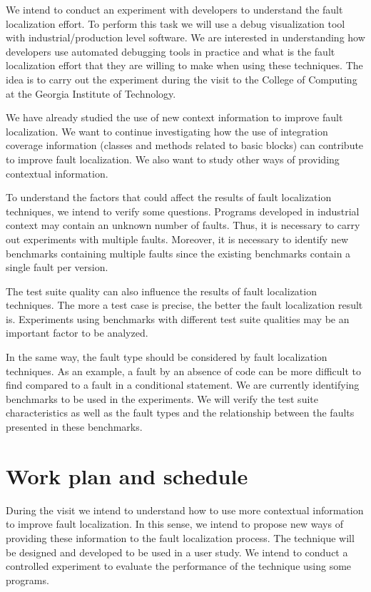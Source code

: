 \documentclass[12pt,a4paper,espaco=umemeio,noindentfirst,oneside,openany,tocpage=plain,pnumromarab,ruledheader,time,anapcustomindent]{sty/abnt}
\begin{document}
We intend to conduct an experiment with developers to understand the fault localization effort. To perform this task we will use a debug visualization 
tool with industrial/production level software. We are interested in understanding how developers use automated debugging tools in practice and what is the fault 
localization effort that they are willing to make when using these techniques. The idea is to carry out the experiment during the visit to the College of Computing 
at the Georgia Institute of Technology.

We have already studied the use of new context information to improve fault localization. We want to continue investigating how the use of integration coverage 
information (classes and methods related to basic blocks) can contribute to improve fault localization. We also want to study other ways of providing contextual 
information.

To understand the factors that could affect the results of fault localization techniques, we intend to verify some questions. Programs developed in industrial context 
may contain an unknown number of faults. Thus, it is necessary to carry out experiments with multiple faults. Moreover, it is necessary to identify new benchmarks 
containing multiple faults since the existing benchmarks contain a single fault per version.

The test suite quality can also influence the results of fault localization techniques. The more a test case is precise, the better the fault localization result is. 
Experiments using benchmarks with different test suite qualities may be an important factor to be analyzed.

In the same way, the fault type should be considered by fault localization techniques. As an example, a fault by an absence of code can be more difficult to find 
compared to a fault in a conditional statement. We are currently identifying benchmarks to be used in the experiments. We will verify the test suite characteristics 
as well as the fault types and the relationship between the faults presented in these benchmarks.						


\section{Work plan and schedule}
\label{workplan}

During the visit we intend to understand how to use more contextual information to improve fault localization. In this sense, we intend to propose new ways of providing 
these information to the fault localization process. The technique will be designed and developed to be used in a user study. We intend to conduct a controlled 
experiment to evaluate the performance of the technique using some programs. 
\end{document}
